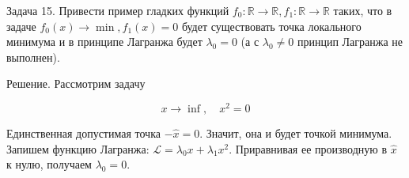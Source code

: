 \begin{task}
Задача 15. Привести пример гладких функций $f_{0}: \mathbb{R} \rightarrow \mathbb{R}, f_{1}: \mathbb{R} \rightarrow \mathbb{R}$ таких, что в задаче $f_{0}(x) 
\rightarrow \min , f_{1}(x)=0$ будет существовать точка локального минимума и в принципе Лагранжа будет $\lambda_{0}=0$ (а с $\lambda_{0} \neq 0$ принцип Лагранжа не выполнен).

Решение. Рассмотрим задачу

$$
x \rightarrow \inf , \quad x^{2}=0
$$

Единственная допустимая точка $-\hat{x}=0$. Значит, она и будет точкой минимума. Запишем функцию Лагранжа: $\mathcal{L}=\lambda_{0} x+\lambda_{1} x^{2}$. Приравнивая ее производную в $\hat{x}$ к нулю, получаем $\lambda_{0}=0$.
\end{task}